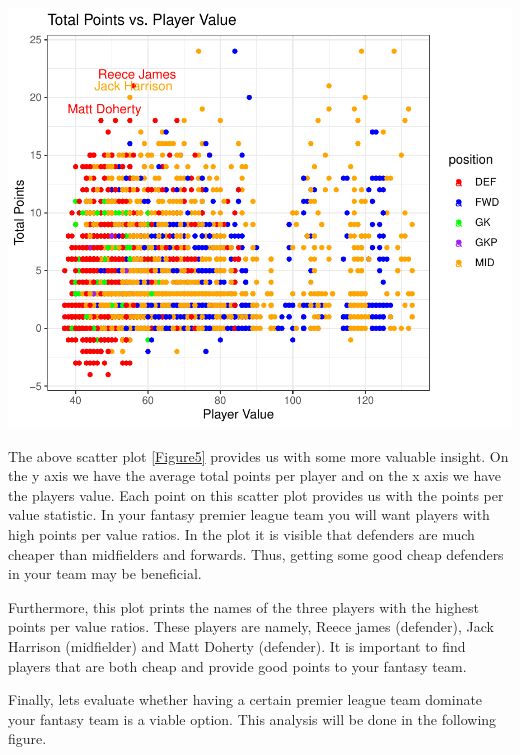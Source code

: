\documentclass[11pt,preprint, authoryear]{elsarticle}
\let\origfigure\figure
\let\endorigfigure\endfigure
\renewenvironment{figure}[1][2] {
    \expandafter\origfigure\expandafter[H]
} {
    \endorigfigure
}
\numberwithin{equation}{section}
\numberwithin{figure}{section}
\numberwithin{table}{section}
\begin{document}
\begin{figure}[H]

{\centering \includegraphics{Fantasy_premier_league_team_prediction_files/figure-latex/unnamed-chunk-6-1} 

}

\caption{Scatter plot of players points per value\label{Figure5}}\label{fig:unnamed-chunk-6}
\end{figure}

The above scatter plot \ref{Figure5} provides us with some more valuable
insight. On the y axis we have the average total points per player and
on the x axis we have the players value. Each point on this scatter plot
provides us with the points per value statistic. In your fantasy premier
league team you will want players with high points per value ratios. In
the plot it is visible that defenders are much cheaper than midfielders
and forwards. Thus, getting some good cheap defenders in your team may
be beneficial.

Furthermore, this plot prints the names of the three players with the
highest points per value ratios. These players are namely, Reece james
(defender), Jack Harrison (midfielder) and Matt Doherty (defender). It
is important to find players that are both cheap and provide good points
to your fantasy team.

Finally, lets evaluate whether having a certain premier league team
dominate your fantasy team is a viable option. This analysis will be
done in the following figure.
\end{document}
